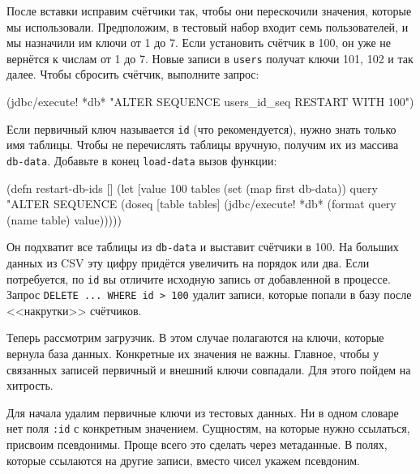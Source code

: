 
После вставки исправим счётчики так, чтобы они перескочили значения, которые мы
использовали. Предположим, в тестовый набор входит семь пользователей, и мы
назначили им ключи от 1 до 7. Если установить счётчик в 100, он уже не вернётся
к числам от 1 до 7. Новые записи в \verb|users| получат ключи 101, 102 и так
далее. Чтобы сбросить счётчик, выполните запрос:

\begin{english}
  \begin{clojure}
(jdbc/execute! *db*
  "ALTER SEQUENCE users_id_seq RESTART WITH 100")
  \end{clojure}
\end{english}

Если первичный ключ называется \verb|id| (что рекомендуется), нужно знать
только имя таблицы. Чтобы не перечислять таблицы вручную, получим их из массива
\verb|db-data|. Добавьте в конец \verb|load-data| вызов функции:


\begin{english}
  \begin{clojure}
(defn restart-db-ids []
  (let [value 100
        tables (set (map first db-data))
        query "ALTER SEQUENCE %
    (doseq [table tables]
      (jdbc/execute! *db* (format query (name table) value)))))
  \end{clojure}
\end{english}

Он подхватит все таблицы из \verb|db-data| и выставит счётчики в 100. На
больших данных из CSV эту цифру придётся увеличить на порядок или два. Если
потребуется, по \verb|id| вы отличите исходную запись от добавленной в
процессе. Запрос \verb|DELETE ... WHERE id > 100| удалит записи, которые
попали в базу после <<накрутки>> счётчиков.

Теперь рассмотрим загрузчик. В этом случае полагаются на ключи, которые вернула
база данных. Конкретные их значения не важны. Главное, чтобы у связанных записей
первичный и внешний ключи совпадали. Для этого пойдем на хитрость.

Для начала удалим первичные ключи из тестовых данных. Ни в одном словаре нет
поля \verb|:id| с конкретным значением. Сущностям, на которые нужно ссылаться,
присвоим псевдонимы. Проще всего это сделать через метаданные. В полях, которые
ссылаются на другие записи, вместо чисел укажем псевдоним.

